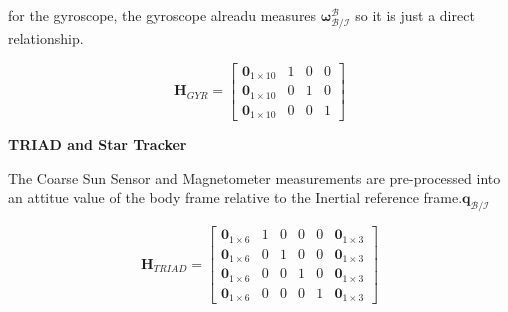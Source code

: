 for the gyroscope, the gyroscope alreadu measures $\boldsymbol{\omega}^\mathcal{B}_\mathcal{B/I}$ so it is just a direct relationship.

\begin{equation}
    \mathbf{H}_{GYR} = 
    \begin{bmatrix}
        \mathbf{0}_{1\times10} & 1 & 0 & 0 \\
        \mathbf{0}_{1\times10} & 0 & 1 & 0 \\
        \mathbf{0}_{1\times10} & 0 & 0 & 1 
    \end{bmatrix}
\end{equation}

\textbf{TRIAD and Star Tracker}

The Coarse Sun Sensor and Magnetometer measurements are pre-processed into an attitue value of the body frame relative to the Inertial reference frame.$\mathbf{q}_\mathcal{B/I}$

\begin{equation}
    \mathbf{H}_{TRIAD} = 
    \begin{bmatrix}
        \mathbf{0}_{1\times6} & 1 & 0 & 0 & 0 & \mathbf{0}_{1\times3}\\
        \mathbf{0}_{1\times6} & 0 & 1 & 0 & 0 &\mathbf{0}_{1\times3}\\
        \mathbf{0}_{1\times6} & 0 & 0 & 1 & 0 &\mathbf{0}_{1\times3}\\
        \mathbf{0}_{1\times6} & 0 & 0 & 0 & 1 & \mathbf{0}_{1\times3}
    \end{bmatrix}
\end{equation}

\label{sec:stateconclusion}